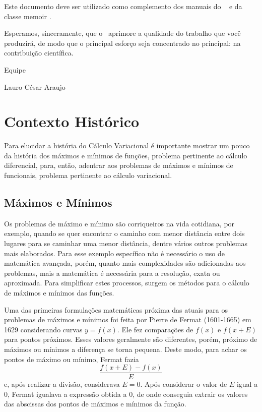 \documentclass[
	12pt,				%
	openright,			%
    twoside,			%
	a4paper,			%
	english,			%
	french,				%
	spanish,			%
	brazil				%
	]{abntex2}
\numberwithin{lema}{chapter}
\numberwithin{teorema}{chapter}
\numberwithin{definicao}{chapter}
\numberwithin{figure}{chapter}
\begin{document}
Este documento deve ser utilizado como complemento dos manuais do \abnTeX\ 
\cite{abntex2classe,abntex2cite,abntex2cite-alf} e da classe \textsf{memoir}
\cite{memoir}. 

Esperamos, sinceramente, que o \abnTeX\ aprimore a qualidade do trabalho que
você produzirá, de modo que o principal esforço seja concentrado no principal:
na contribuição científica.

Equipe \abnTeX 

Lauro César Araujo

\fi

\chapter{Contexto Histórico}

Para elucidar a história do Cálculo Variacional é importante mostrar um pouco da história dos máximos e mínimos de funções, problema pertinente ao cálculo diferencial, para, então, adentrar aos problemas de máximos e mínimos de funcionais, problema pertinente ao cálculo variacional.

\section{Máximos e Mínimos}

Os problemas de máximo e mínimo são corriqueiros na vida cotidiana, por exemplo, quando se quer encontrar o caminho com menor distância entre dois lugares para se caminhar uma menor distância, dentre vários outros problemas mais elaborados. Para esse exemplo específico não é necessário o uso de matemática avançada, porém, quanto mais complexidades são adicionadas aos problemas, mais a matemática é necessária para a resolução, exata ou aproximada. Para simplificar estes processos, surgem os métodos para o cálculo de máximos e mínimos das funções.

Uma das primeiras formulações matemáticas próxima das atuais para os problemas de máximos e mínimos foi feita por Pierre de Fermat (1601-1665) em 1629 considerando curvas $y=f(x)$. Ele fez comparações de $f(x)$ e $f(x+E)$ para pontos próximos. Esses valores geralmente são diferentes, porém, próximo de máximos ou mínimos a diferença se torna pequena. Deste modo, para achar os pontos de máximo ou mínimo, Fermat fazia $$\frac{f(x+E)-f(x)}{E}$$ e, após realizar a divisão, considerava $E=0$. Após considerar o valor de $E$ igual a $0$, Fermat igualava a expressão obtida a $0$, de onde conseguia extrair os valores das abscissas dos pontos de máximos e mínimos da função. \cite{boyer}
\end{document}
